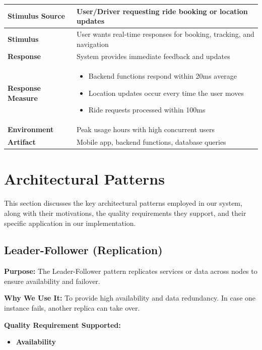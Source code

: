 \documentclass[12pt]{article}
\begin{document}
\begin{itemize}
  \begin{table}[H]
\centering
\begin{tabular}{|l|p{10cm}|}
\hline
\textbf{Stimulus Source} & User/Driver requesting ride booking or location updates \\
\hline
\textbf{Stimulus} & User wants real-time responses for booking, tracking, and navigation \\
\hline
\textbf{Response} & System provides immediate feedback and updates \\
\hline
\textbf{Response Measure} & 
\begin{itemize}
  \item Backend functions respond within 20ms average
  \item Location updates occur every time the user moves
  \item Ride requests processed within 100ms
\end{itemize} \\
\hline
\textbf{Environment} & Peak usage hours with high concurrent users \\
\hline
\textbf{Artifact} & Mobile app, backend functions, database queries \\
\hline
\end{tabular}
\end{table}
\end{itemize}

\section{Architectural Patterns}

This section discusses the key architectural patterns employed in our system, along with their motivations, the quality requirements they support, and their specific application in our implementation.

\subsection{Leader-Follower (Replication)}

\textbf{Purpose:} The Leader-Follower pattern replicates services or data across nodes to ensure availability and failover.

\textbf{Why We Use It:} To provide high availability and data redundancy. In case one instance fails, another replica can take over.

\textbf{Quality Requirement Supported:}
\begin{itemize}
    \item \textbf{Availability}
\end{itemize}
\end{document}
